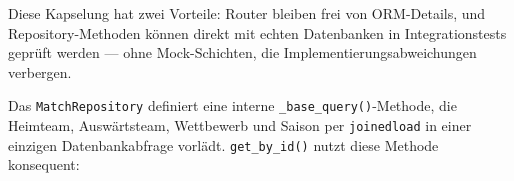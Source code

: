 \begin{Shaded}
\begin{Highlighting}[]
\OperatorTok{=}

    \NormalTok{) }\OperatorTok{{-}\textgreater{}}
         \NormalTok{(}
\OperatorTok{==}

    \OperatorTok{=}\NormalTok{) }\OperatorTok{{-}\textgreater{}} \NormalTok{[TickerEntry]:}
\end{Highlighting}
\end{Shaded}

Diese Kapselung hat zwei Vorteile: Router bleiben frei von ORM-Details,
und Repository-Methoden können direkt mit echten Datenbanken in
Integrationstests geprüft werden --- ohne Mock-Schichten, die
Implementierungsabweichungen verbergen.

Das \texttt{MatchRepository} definiert eine interne
\texttt{\_base\_query()}-Methode, die Heimteam, Auswärtsteam, Wettbewerb
und Saison per \texttt{joinedload} in einer einzigen Datenbankabfrage
vorlädt. \texttt{get\_by\_id()} nutzt diese Methode konsequent:

\begin{Shaded}
\begin{Highlighting}[]
\OperatorTok{=}

    \NormalTok{) }\OperatorTok{{-}\textgreater{}}
         
\NormalTok{        )}

    \NormalTok{) }\OperatorTok{{-}\textgreater{}}
          \OperatorTok{==}
\end{Highlighting}
\end{Shaded}

